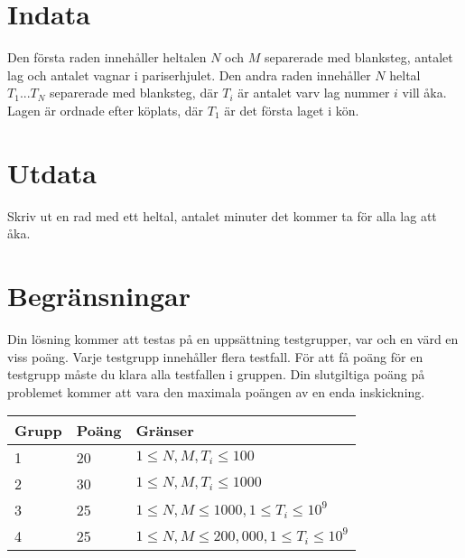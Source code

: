 
\section*{Indata}
Den första raden innehåller heltalen $N$ och $M$ separerade med blanksteg,
antalet lag och antalet vagnar i pariserhjulet.
Den andra raden innehåller $N$ heltal $T_1 ... T_N$ separerade med blanksteg,
där $T_i$ är antalet varv lag nummer $i$ vill åka. Lagen är ordnade efter
köplats, där $T_1$ är det första laget i kön.

\section*{Utdata}
Skriv ut en rad med ett heltal, antalet minuter det kommer ta för alla lag att åka.

\section*{Begränsningar}
Din lösning kommer att testas på en uppsättning testgrupper, var och en värd en viss poäng.
Varje testgrupp innehåller flera testfall.
För att få poäng för en testgrupp måste du klara alla testfallen i gruppen.
Din slutgiltiga poäng på problemet kommer att vara den maximala poängen av en enda inskickning.

\noindent
\begin{tabular}{| l | l | l |}
\hline
Grupp & Poäng & Gränser \\ \hline
1     & 20    & $1 \le N, M, T_i \le 100$ \\ \hline
2     & 30    & $1 \le N, M, T_i \le 1000$ \\ \hline
3     & 25    & $1 \le N, M \le 1000, 1 \le T_i \le 10^9$ \\ \hline
4     & 25    & $1 \le N, M \le 200,000, 1 \le T_i \le 10^9$ \\ \hline
\end{tabular}
